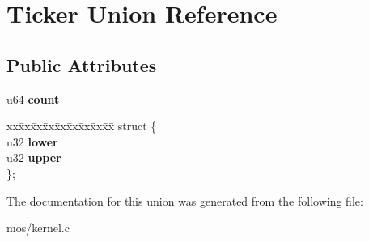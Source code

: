 \hypertarget{unionTicker}{}\section{Ticker Union Reference}
\label{unionTicker}
\subsection*{Public Attributes}
\begin{DoxyCompactItemize}
\item 
\mbox{\label{unionTicker_a023a42cca05e44013b3fedccfeac32b5}} 
u64 {\bfseries count}
\item 
\mbox{\label{unionTicker_ae164d38652d655a9ed82603e0f1e7d3a}} 
\begin{tabbing}
xx\=xx\=xx\=xx\=xx\=xx\=xx\=xx\=xx\=\kill
struct \{\\
\>u32 {\bfseries lower}\\
\>u32 {\bfseries upper}\\
\}; \\

\end{tabbing}\end{DoxyCompactItemize}


The documentation for this union was generated from the following file\+:\begin{DoxyCompactItemize}
\item 
mos/kernel.\+c\end{DoxyCompactItemize}
